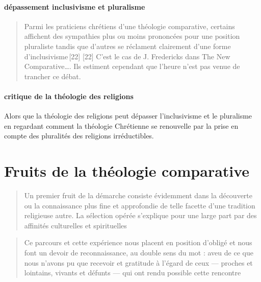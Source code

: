 \paragraph{dépassement inclusivisme et pluralisme}
\begin{quote}
        Parmi les praticiens chrétiens d’une théologie comparative, certains affichent des sympathies plus ou moins prononcées pour une position pluraliste tandis que d’autres se réclament clairement d’une forme d’inclusivisme [22] [22] C’est le cas de J. Fredericks dans The New Comparative…. Ils estiment cependant que l’heure n’est pas venue de trancher ce débat.
\end{quote}



\paragraph{critique de la théologie des religions} Alors que la théologie des religions peut dépasser l'inclusivisme et le pluralisme en regardant comment la théologie Chrétienne se renouvelle par la prise en compte des pluralités des religions irréductibles. 


 \section{Fruits de la théologie comparative}
 \begin{quote}
        Un premier fruit de la démarche consiste évidemment dans la découverte ou la connaissance plus fine et approfondie de telle facette d’une tradition religieuse autre. La sélection opérée s’explique pour une large part par des affinités culturelles et spirituelles
\end{quote}
 
 
 \begin{quote}
        Ce parcours et cette expérience nous placent en position d’obligé et nous font un devoir de reconnaissance, au double sens du mot : aveu de ce que nous n’avons pu que recevoir et gratitude à l’égard de ceux — proches et lointains, vivants et défunts — qui ont rendu possible cette rencontre
\end{quote}


